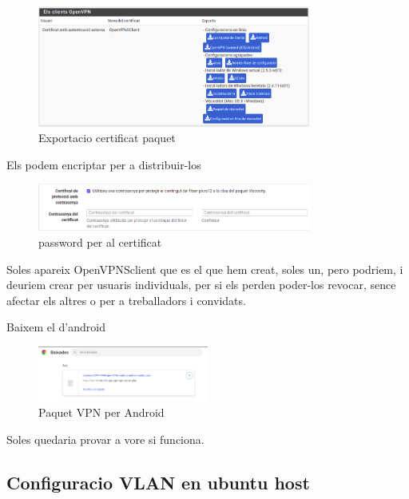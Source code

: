 \documentclass[
  10pt,
]{krantz}
\begin{document}
\begin{figure}
\centering
\includegraphics[width=0.8\textwidth,height=\textheight]{imatges/proxmox/Exporta_vpn_client2.png}
\caption{Exportacio certificat paquet}
\end{figure}

Els podem encriptar per a distribuir-los

\begin{figure}
\centering
\includegraphics[width=0.8\textwidth,height=\textheight]{imatges/proxmox/Password_cert.png}
\caption{password per al certificat}
\end{figure}

Soles apareix OpenVPNSclient que es el que hem creat, soles un, pero podriem, i deuriem crear per usuaris individuals, per si els perden poder-los revocar, sence afectar els altres o per a treballadors i convidats.

Baixem el d'android

\begin{figure}
\centering
\includegraphics[width=0.5\textwidth,height=\textheight]{imatges/proxmox/VPN_andorid.png}
\caption{Paquet VPN per Android}
\end{figure}

Soles quedaria provar a vore si funciona.

\hypertarget{configuracio-vlan-en-ubuntu-host}{%
\subsection{Configuracio VLAN en ubuntu host}\label{configuracio-vlan-en-ubuntu-host}}
\end{document}
